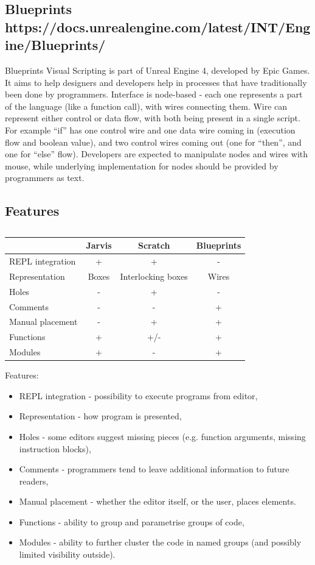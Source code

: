 \documentclass[11pt]{scrartcl}
\begin{document}
\subsection{Blueprints {https://docs.unrealengine.com/latest/INT/Engine/Blueprints/}}
Blueprints Visual Scripting is part of Unreal Engine 4, developed by Epic Games. It aims to help designers and developers help in processes that have traditionally been done by programmers. Interface is node-based - each one represents a part of the language (like a function call), with wires connecting them. Wire can represent either control or data flow, with both being present in a single script. For example “if” has one control wire and one data wire coming in (execution flow and boolean value), and two control wires coming out (one for “then”, and one for “else” flow). Developers are expected to manipulate nodes and wires with mouse, while underlying implementation for nodes should be provided by programmers as text.

\subsection{Features}
\begin{table}[hbt]
  \begin{tabular}{l|ccc}
    & Jarvis & Scratch & Blueprints \\
    \hline
    REPL integration & + & + & - \\
    Representation & Boxes & Interlocking boxes & Wires \\
    Holes & - & + & - \\
    Comments & - & - & + \\
    Manual placement & - & + & + \\
    Functions & + & +/- & + \\
    Modules & + & - & + \\
  \end{tabular}
  \caption{}
\end{table}
Features:
\begin{itemize}
  \item REPL integration - possibility to execute programs from editor,
  \item Representation - how program is presented,
  \item Holes - some editors suggest missing pieces (e.g. function arguments, missing instruction blocks),
  \item Comments - programmers tend to leave additional information to future readers,
  \item Manual placement - whether the editor itself, or the user, places elements.
  \item Functions - ability to group and parametrise groups of code,
  \item Modules - ability to further cluster the code in named groups (and possibly limited visibility outside).
\end{itemize}
\end{document}
